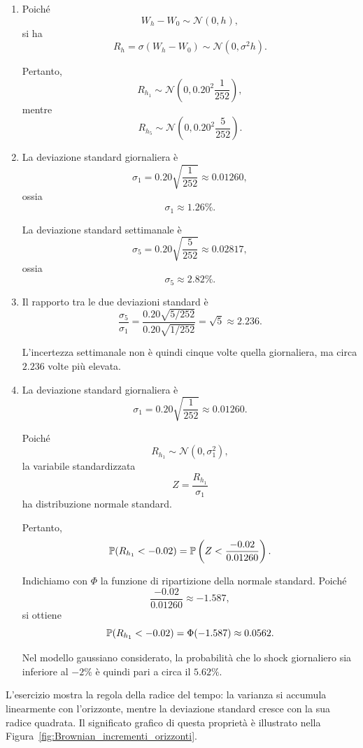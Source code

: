 \begin{enumerate}

\item Poich\'{e}
\[
W_h-W_0\sim\mathcal{N}(0,h),
\]
si ha
\[
R_h
=
\sigma(W_h-W_0)
\sim
\mathcal{N}(0,\sigma^2h).
\]

Pertanto,
\[
R_{h_1}
\sim
\mathcal{N}
\left(
0,
0.20^2\frac{1}{252}
\right),
\]
mentre
\[
R_{h_5}
\sim
\mathcal{N}
\left(
0,
0.20^2\frac{5}{252}
\right).
\]

\item La deviazione standard giornaliera \`{e}
\[
\sigma_1
=
0.20\sqrt{\frac{1}{252}}
\approx
0.01260,
\]
ossia
\[
\sigma_1\approx 1.26\%.
\]

La deviazione standard settimanale \`{e}
\[
\sigma_5
=
0.20\sqrt{\frac{5}{252}}
\approx
0.02817,
\]
ossia
\[
\sigma_5\approx 2.82\%.
\]

\item Il rapporto tra le due deviazioni standard \`{e}
\[
\frac{\sigma_5}{\sigma_1}
=
\frac{
0.20\sqrt{5/252}
}{
0.20\sqrt{1/252}
}
=
\sqrt{5}
\approx
2.236.
\]

L'incertezza settimanale non \`{e} quindi cinque volte quella
giornaliera, ma circa $2.236$ volte pi\`{u} elevata.

\item La deviazione standard giornaliera \`{e}
\[
\sigma_1
=
0.20\sqrt{\frac{1}{252}}
\approx
0.01260.
\]

Poich\'{e}
\[
R_{h_1}
\sim
\mathcal{N}(0,\sigma_1^2),
\]
la variabile standardizzata
\[
Z
=
\frac{R_{h_1}}{\sigma_1}
\]
ha distribuzione normale standard.

Pertanto,
\[
\mathbb{P}(R_{h_1}<-0.02)
=
\mathbb{P}\left(
Z<
\frac{-0.02}{0.01260}
\right).
\]

Indichiamo con $\Phi$ la funzione di ripartizione della normale
standard. Poich\'{e}
\[
\frac{-0.02}{0.01260}
\approx
-1.587,
\]
si ottiene
\[
\mathbb{P}(R_{h_1}<-0.02)
=
\Phi(-1.587)
\approx
0.0562.
\]

Nel modello gaussiano considerato, la probabilit\`{a} che lo shock
giornaliero sia inferiore al $-2\%$ \`{e} quindi pari a circa il
$5.62\%$.

\end{enumerate}

L'esercizio mostra la regola della radice del tempo: la varianza si
accumula linearmente con l'orizzonte, mentre la deviazione standard
cresce con la sua radice quadrata. Il significato grafico di questa
propriet\`{a} \`{e} illustrato nella
Figura~\ref{fig:Brownian_incrementi_orizzonti}.


